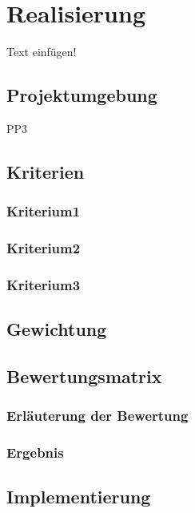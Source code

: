 \chapter{Realisierung}
\label{ch:Realisierung}
Text einfügen!

\section{Projektumgebung}
PP3

\section{Kriterien}

\subsection{Kriterium1}

\subsection{Kriterium2}

\subsection{Kriterium3}


\section{Gewichtung}

\section{Bewertungsmatrix}

\subsection{Erläuterung der Bewertung}

\subsection{Ergebnis}

\section{Implementierung}